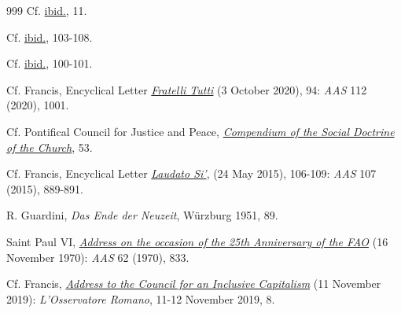 \documentclass{article}
\begin{document}
\begin{thebibliography}{999}
 Cf. \href{https://www.synod.va/content/dam/synod/news/2024-10-26_final-document/ENG---Documento-finale.pdf}{ibid.}, 11.

 Cf. \href{https://www.synod.va/content/dam/synod/news/2024-10-26_final-document/ENG---Documento-finale.pdf}{ibid.}, 103-108.

 Cf. \href{https://www.synod.va/content/dam/synod/news/2024-10-26_final-document/ENG---Documento-finale.pdf}{ibid.}, 100-101.

 Cf. Francis, Encyclical Letter \href{https://www.vatican.va/content/francesco/en/encyclicals/documents/papa-francesco_20201003_enciclica-fratelli-tutti.html}{\emph{Fratelli Tutti}} (3 October 2020), 94: \emph{AAS} 112 (2020), 1001.

 Cf. Pontifical Council for Justice and Peace, \href{https://www.vatican.va/roman_curia/pontifical_councils/justpeace/documents/rc_pc_justpeace_doc_20060526_compendio-dott-soc_en.html}{\emph{Compendium of the Social Doctrine of the Church}}, 53.

 Cf. Francis, Encyclical Letter \href{https://www.vatican.va/content/francesco/en/encyclicals/documents/papa-francesco_20150524_enciclica-laudato-si.html}{\emph{Laudato Si'}}, (24 May 2015), 106-109: \emph{AAS} 107 (2015), 889-891.

 R. Guardini, \emph{Das Ende der Neuzeit}, Würzburg 1951, 89.

 Saint Paul VI, \href{https://www.vatican.va/content/paul-vi/en/speeches/1970/documents/hf_p-vi_spe_19701116_xxv-istituzione-fao.html}{\emph{Address on the occasion of the 25th Anniversary of the FAO}} (16 November 1970): \emph{AAS} 62 (1970), 833.

 Cf. Francis, \href{https://www.vatican.va/content/francesco/en/speeches/2019/november/documents/papa-francesco_20191111_consiglio-capitalismo-inclusivo.html}{\emph{Address to the Council for an Inclusive Capitalism}} (11 November 2019): \emph{L'Osservatore Romano}, 11-12 November 2019, 8.


\end{thebibliography}
\end{document}

